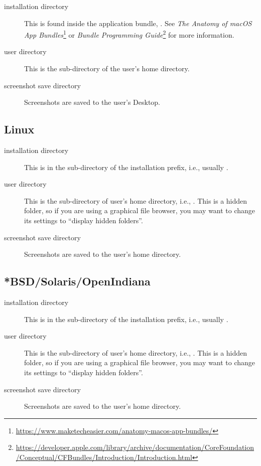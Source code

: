 \begin{description}
\item[installation directory] This is found inside the application
  bundle, . See \emph{The Anatomy of macOS App 
  Bundles}\footnote{\url{https://www.maketecheasier.com/anatomy-macos-app-bundles/}}
  or \emph{Bundle Programming Guide}\footnote{\url{https://developer.apple.com/library/archive/documentation/CoreFoundation/Conceptual/CFBundles/Introduction/Introduction.html}} 
  for more information.
\item[user directory] This is the sub-directory 
   of the user's home
  directory.
\item[screenshot save directory] Screenshots are saved to the user's
  Desktop.
\end{description}

\subsection{Linux}
\label{sec:FilesAndDirectories:Linux}

\begin{description}
\item[installation directory] This is in the
   sub-directory of the installation prefix,
  i.e., usually .
\item[user directory] This is the  sub-directory of
  user's home directory, i.e.,
  . This is a hidden folder, so
  if you are using a graphical file browser, you may want to change
  its settings to ``display hidden folders''.
\item[screenshot save directory] Screenshots are saved to the user's
  home directory.
\end{description}

\subsection{*BSD/Solaris/OpenIndiana}
\label{sec:FilesAndDirectories:UNIX}

\begin{description}
\item[installation directory] This is in the
   sub-directory of the installation prefix,
  i.e., usually .
\item[user directory] This is the  sub-directory of
  user's home directory, i.e.,
  . This is a hidden folder, so
  if you are using a graphical file browser, you may want to change
  its settings to ``display hidden folders''.
\item[screenshot save directory] Screenshots are saved to the user's
  home directory.
\end{description}

